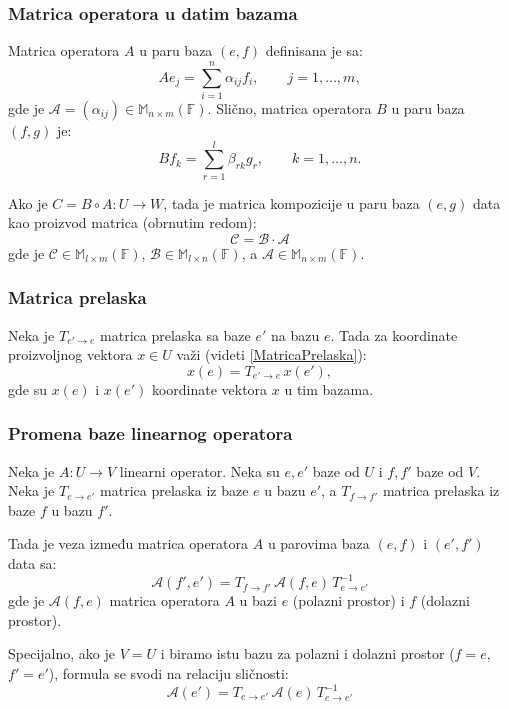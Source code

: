 \documentclass[a4paper,12pt,twoside]{report}
\numberwithin{algorithm}{section}
\begin{document}
\medskip
\noindent
\subsubsection*{Matrica operatora u datim bazama} 
Matrica operatora $A$ u paru baza $(e, f)$ definisana je sa:
\[
Ae_j = \sum_{i=1}^{n} \alpha_{ij} f_i, \qquad j = 1, \dots, m,
\]
gde je $\mathcal{A} = (\alpha_{ij}) \in \mathbb{M}_{n \times m}(\mathbb{F})$.
Slično, matrica operatora $B$ u paru baza $(f, g)$ je:
\[
Bf_k = \sum_{r=1}^{l} \beta_{rk} g_r, \qquad k = 1, \dots, n.
\]

Ako je $C = B \circ A : U \to W$, tada je matrica kompozicije u paru baza $(e, g)$ data kao proizvod matrica (obrnutim redom):
\[
\boxed{\mathcal{C} = \mathcal{B} \cdot \mathcal{A}}
\]
gde je $\mathcal{C} \in \mathbb{M}_{l \times m}(\mathbb{F})$, $\mathcal{B} \in \mathbb{M}_{l \times n}(\mathbb{F})$, a $\mathcal{A} \in \mathbb{M}_{n \times m}(\mathbb{F})$.

\medskip
\noindent
\subsubsection*{Matrica prelaska} 
Neka je $T_{e' \to e}$ matrica prelaska sa baze $e'$ na bazu $e$. Tada za koordinate proizvoljnog vektora $x \in U$ važi (videti \ref{MatricaPrelaska}):
\[
x(e) = T_{e' \to e} \, x(e'),
\]
gde su $x(e)$ i $x(e')$ koordinate vektora $x$ u tim bazama.

\medskip
\noindent
\subsubsection*{Promena baze linearnog operatora}

Neka je $A: U \to V$ linearni operator. Neka su $e, e'$ baze od $U$ i $f, f'$ baze od $V$. 
Neka je $T_{e \to e'}$ matrica prelaska iz baze $e$ u bazu $e'$, 
a $T_{f \to f'}$ matrica prelaska iz baze $f$ u bazu $f'$.

Tada je veza između matrica operatora $A$ u parovima baza $(e, f)$ i $(e', f')$ data sa:
\[
\boxed{\mathcal{A}(f', e') = T_{f \to f'} \, \mathcal{A}(f, e) \, T_{e \to e'}^{-1}}
\]
gde je $\mathcal{A}(f, e)$ matrica operatora $A$ u bazi $e$ (polazni prostor) i $f$ (dolazni prostor).

Specijalno, ako je $V = U$ i biramo istu bazu za polazni i dolazni prostor ($f = e$, $f' = e'$), formula se svodi na relaciju sličnosti:
\[
\boxed{\mathcal{A}(e') = T_{e \to e'} \, \mathcal{A}(e) \, T_{e \to e'}^{-1}}
\]
\end{document}
